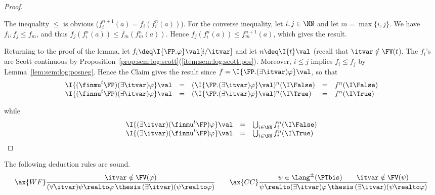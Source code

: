 \begin{proof}
\begin{claimproof}
The inequality $\leq$ is obvious
($f_i^{n+1}(a) = f_i(f_i^{n}(a))$).
For the converse inequality, let $i, j \in \NN$ and let $m = \max\{i,j\}$.
We have $f_i, f_j \leq f_m$, and thus $f_j(f_i^n(a)) \leq f_m(f_m^n(a))$.
Hence $f_j(f_i^n(a)) \leq f_m^{n+1}(a)$, which gives the result.
\end{claimproof}

Returning to the proof of the lemma,
let $f_i \deq \I{\FP.\varphi}\val[i / \itvar]$
and let $n \deq \I{t}\val$ (recall that $\itvar \notin \FV(t$).
The $f_i$'s are Scott continuous by
Proposition~\ref{prop:sem:log:scott}(\ref{item:sem:log:scott:pos}).
Moreover, $i \leq j$ implies $f_i \leq f_j$
by Lemma~\ref{lem:sem:log:posneg}.
%
Hence the Claim gives the result since
$f = \I{\FP.(\exists \itvar)\varphi}\val$,
so that
\[
\begin{array}{r c l c l}
  \I{(\finmu^t \FP)(\exists \itvar)\varphi}\val
& =
& (\I{\FP. (\exists \itvar)\varphi}\val)^n(\I\False)
& =
& f^n(\I\False)
\\
%
  \I{(\finnu^t \FP)(\exists \itvar)\varphi}\val
& =
& (\I{\FP. (\exists \itvar)\varphi}\val)^n(\I\True)
& =
& f^n(\I\True)
%
\end{array}
\]

\noindent
while
\[
\begin{array}{r c l}
  \I{(\exists \itvar)(\finmu^t \FP)\varphi}\val
& =
& \bigcup_{i \in \NN} f_i^n(\I\False)
\\
%
  \I{(\exists \itvar)(\finnu^t \FP)\varphi}\val
& =
& \bigcup_{i \in \NN} f_i^n(\I\True)
%
\end{array}
\]
\end{proof}


\begin{lemma}
\label{lem:proof:sem:log:sound:wfcc}
The following deduction rules are sound.
\[
\begin{array}{c}
%
\ax{WF}
\dfrac{\itvar \notin \FV(\varphi)}
  {(\forall \itvar)\psi \realto \varphi
  \,\thesis\,
  (\exists \itvar)(\psi \realto \varphi)}
%
\qquad
%
\ax{CC}
\dfrac{\psi \in \Lang^\pm(\PTbis)
  \qquad
  \itvar \notin \FV(\psi)}
  {\psi \realto (\exists \itvar)\varphi
  \,\thesis\,
  (\exists \itvar)(\psi \realto \varphi)}
%
\end{array}
\]
\end{lemma}

